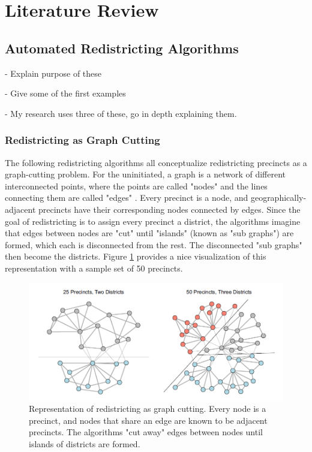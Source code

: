 \section{Literature Review}

\subsection{Automated Redistricting Algorithms}

- Explain purpose of these

- Give some of the first examples

- My research uses three of these, go in depth explaining them. 

\subsubsection{Redistricting as Graph Cutting}

The following redistricting algorithms all conceptualize redistricting precincts as a graph-cutting problem. For the uninitiated, a graph is a network of different interconnected points, where the points are called "nodes" and the lines connecting them are called "edges" \parencite{fifield2020}. Every precinct is a node, and geographically-adjacent precincts have their corresponding nodes connected by edges. Since the goal of redistricting is to assign every precinct a district, the algorithms imagine that edges between nodes are "cut" until "islands" (known as "sub graphs") are formed, which each is disconnected from the rest. The disconnected "sub graphs" then become the districts. Figure \ref{fig:graphcut} provides a nice visualization of this representation with a sample set of 50 precincts\parencite{fifield2020}. 

\begin{figure}
    \includegraphics[width=\linewidth]{img/graphcut.png}
    \caption{Representation of redistricting as graph cutting. Every node is a precinct, and nodes that share an edge are known to be adjacent precincts. The algorithms "cut away" edges between nodes until islands of districts are formed. \parencite[3]{fifield2020}}
    \label{fig:graphcut}
\end{figure}

